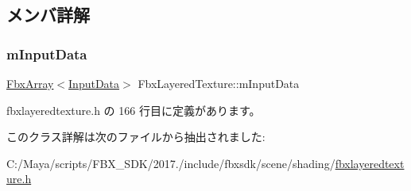 \subsection{メンバ詳解}
\mbox{\label{class_fbx_layered_texture_ae06d32684ea2f049c21abb66dfc30d4f}} 
\subsubsection{\texorpdfstring{m\+Input\+Data}{mInputData}}
{\footnotesize\ttfamily \hyperlink{class_fbx_array}{Fbx\+Array}$<$\hyperlink{struct_fbx_layered_texture_1_1_input_data}{Input\+Data}$>$ Fbx\+Layered\+Texture\+::m\+Input\+Data}



 fbxlayeredtexture.\+h の 166 行目に定義があります。



このクラス詳解は次のファイルから抽出されました\+:\begin{DoxyCompactItemize}
\item 
C\+:/\+Maya/scripts/\+F\+B\+X\+\_\+\+S\+D\+K/2017./include/fbxsdk/scene/shading/\hyperlink{fbxlayeredtexture_8h}{fbxlayeredtexture.\+h}\end{DoxyCompactItemize}

